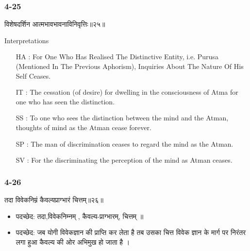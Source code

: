 \begin{frame}[fragile]\frametitle{4-25}
\begin{sanskrit}
विशेषदर्शिन आत्मभावभावनाविनिवृत्तिः॥२५॥
\end{sanskrit}

Interpretations
\begin{itemize}	
\item [HA]: For One Who Has Realised The Distinctive Entity, i.e. Purusa (Mentioned In The Previous Aphorism), Inquiries About The Nature Of His Self Ceases.
\item [IT]: The cessation (of desire) for dwelling in the consciousness of Atma for one who has seen the distinction.
\item [SS]: To one who sees the distinction between the mind and the Atman, thoughts of mind as the Atman cease forever.
\item [SP]: The man of discrimination ceases to regard the mind as the Atman.
\item [SV]: For the discriminating the perception of the mind as Atman ceases. 
\end{itemize}
\end{frame}

\begin{frame}[fragile]\frametitle{4-26}
\begin{sanskrit}
तदा विवेकनिम्नं कैवल्यप्राग्भारं चित्तम्॥२६॥
\end{sanskrit}

\begin{itemize}
\item पदच्छेद:  तदा,विवेकनिम्नम् , कैवल्य-प्राग्भारम्, चित्तम् ॥
\item पदच्छेद:  जब योगी विवेकज्ञान की प्राप्ति कर लेता है तब उसका चित्त विवेक ज्ञान के मार्ग पर निरंतर लगा हुआ कैवल्य की ओर अभिमुख हो जाता है ।
\end{itemize}
\end{frame}


